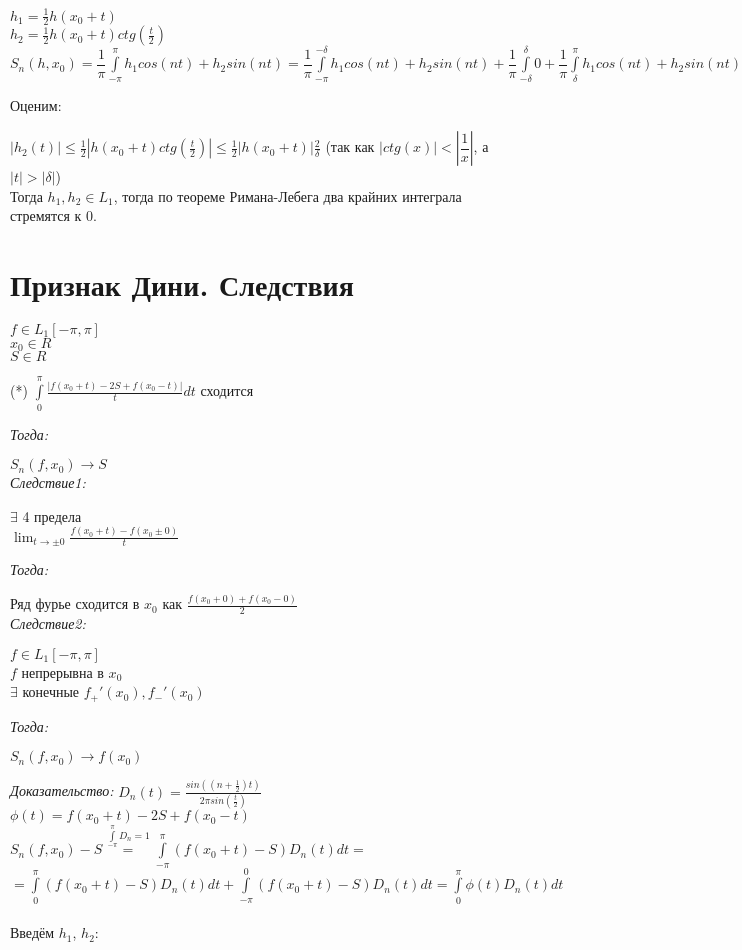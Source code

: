 \documentclass[paper=a4, fontsize=14pt]{report}
\begin{document}
$ h_1 = \frac{1}{2} h(x_0 + t) $\\
$ h_2 = \frac{1}{2} h(x_0 + t) ctg(\frac{t}{2}) $\\
$S_n(h, x_0) = \dfrac{1}{\pi}\int\limits_{-\pi}^{\pi} h_1 cos(nt) + h_2 sin(nt) = \dfrac{1}{\pi}\int\limits_{-\pi}^{-\delta} h_1 cos(nt) + h_2 sin(nt) + \dfrac{1}{\pi}\int\limits_{-\delta}^{\delta} 0 + \dfrac{1}{\pi}\int\limits_{\delta}^{\pi} h_1 cos(nt) + h_2 sin(nt)$

Оценим:

$ |h_2(t)| \leq \frac{1}{2} |h(x_0 + t) ctg(\frac{t}{2})| \leq \frac{1}{2} |h(x_0 + t)| \frac{2}{\delta} $ (так как $|ctg(x)| < |\dfrac{1}{x}|$, а $|t| > |\delta|$)\\

Тогда $h_1, h_2 \in L_1$, тогда по теореме Римана-Лебега два крайних интеграла стремятся к 0.


    \section{Признак Дини. Следствия}

    $ f \in L_1[-\pi, \pi] $\\
    $ x_0 \in R $\\
    $ S \in R $

    (*) $ \int\limits_{0}^{\pi} \frac{|f(x_0 + t) - 2S + f(x_0 - t)|}{t} dt $ сходится

    \emph{Тогда:}

    $ S_n(f, x_0) \to S $\\

    \emph{Следствие1:}

    $ \exists $ 4 предела\\
    $ \lim_{t \to \pm 0} \frac{f(x_0 + t) - f(x_0 \pm 0)}{t} $

    \emph{Тогда:}

    Ряд фурье сходится в $ x_0 $ как $ \frac{f(x_0 + 0) + f(x_0 - 0)}{2} $\\

    \emph{Следствие2:}

    $ f \in L_1[-\pi, \pi] $\\
    $ f $ непрерывна в  $ x_0 $\\
    $ \exists $ конечные $ f_{+}'(x_0), f_{-}'(x_0) $

    \emph{Тогда:}

    $ S_n(f, x_0) \to f(x_0) $
    
    
    \emph{Доказательство:}
$ D_n(t) = \frac{sin((n + \frac{1}{2})t)}{2\pi sin(\frac{t}{2})} $\\
$ \phi(t) = f(x_0 + t) - 2S + f(x_0 - t) $\\
$ S_n(f, x_0) - S \overset{\int\limits_{-\pi}^{\pi}D_n = 1}{=} \int\limits_{-\pi}^{\pi} (f(x_0 + t) - S) D_n(t) dt =$\\
$ = \int\limits_{0}^{\pi} (f(x_0 + t) - S) D_n(t) dt + \int\limits_{-\pi}^{0} (f(x_0 + t) - S) D_n(t) dt
 = \int\limits_{0}^{\pi} \phi(t) D_n(t) dt $
\\\\
Введём $h_1$, $h_2$:
\end{document}
